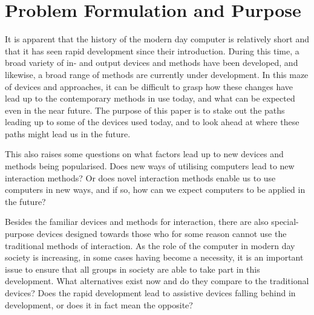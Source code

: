 
\section{Problem Formulation and Purpose}
It is apparent that the history of the modern day computer is relatively short and that it has seen rapid development since their introduction. During this time, a broad variety of in- and output devices and methods have been developed, and likewise, a broad range of methods are currently under development. In this maze of devices and approaches, it can be difficult to grasp how these changes have lead up to the contemporary methods in use today, and what can be expected even in the near future. The purpose of this paper is to stake out the paths leading up to some of the devices used today, and to look ahead at where these paths might lead us in the future.

This also raises some questions on what factors lead up to new devices and methods being popularised. Does new ways of utilising computers lead to new interaction methods? Or does novel interaction methods enable us to use computers in new ways, and if so, how can we expect computers to be applied in the future?

Besides the familiar devices and methods for interaction, there are also special-purpose devices designed towards those who for some reason cannot use the traditional methods of interaction. As the role of the computer in modern day society is increasing, in some cases having become a necessity, it is an important issue to ensure that all groups in society are able to take part in this development. What alternatives exist now and do they compare to the traditional devices? Does the rapid development lead to assistive devices falling behind  in development, or does it in fact mean the opposite?


